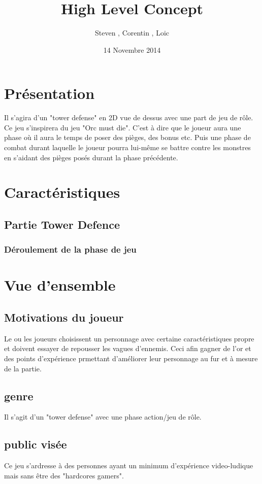 \documentclass[12pt]{article}
\title{High Level Concept}
\author{Steven \bsc{Gerard}, Corentin \bsc{Raoult}, Loic \bsc{Tessier}}
\date {14 Novembre 2014}
\begin{document}
\maketitle{}

\section{Présentation}
Il s’agira d’un "tower defense" en 2D vue de dessus avec une part de jeu de rôle. Ce jeu
s'inspirera du jeu "Orc must die". C'est à dire que le joueur aura une phase où il aura le temps
de poser des pièges, des bonus etc. Puis une phase de combat durant laquelle le joueur pourra
lui-même se battre contre les monstres en s'aidant des pièges posés durant la phase précédente.

\section{Caractéristiques}
\subsection{Partie Tower Defence}
\subsubsection{Déroulement de la phase de jeu}

\section{Vue d'ensemble}
\subsection{Motivations du joueur}
Le ou les joueurs choisissent un personnage avec certaine caractéristiques propre et doivent essayer de repousser les vagues d'ennemis. Ceci afin gagner de l'or et des points d'expérience prmettant d'améliorer leur personnage au fur et à mesure de la partie.
\subsection{genre}
Il s'agit d'un "tower defense" avec une phase action/jeu de rôle.
\subsection{public visée}
Ce jeu s'ardresse à des personnes ayant un minimum d'expérience video-ludique mais sans être des "hardcores gamers".
\end{document}
